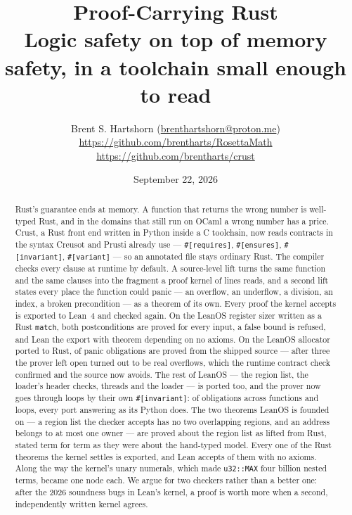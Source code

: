 \documentclass[11pt]{article}
\title{Proof-Carrying Rust\\
\large Logic safety on top of memory safety, in a toolchain small enough to read}
\author{Brent S. Hartshorn \orcidlink{0009-0004-2853-655X}
        \small (\url{brenthartshorn@proton.me})
\\
\small
\url{https://github.com/brentharts/RosettaMath}
\quad
\url{https://github.com/brentharts/crust}
}
\date{September 22, 2026}
\begin{document}
\maketitle

\begin{abstract}
Rust's guarantee ends at memory.  A function that returns the wrong number
is well-typed Rust, and in the domains that still run on OCaml a wrong
number has a price.  Crust, a Rust front end written in Python inside a C
toolchain, now reads contracts in the syntax Creusot and Prusti already use
--- \texttt{\#[requires]}, \texttt{\#[ensures]}, \texttt{\#[invariant]},
\texttt{\#[variant]} --- so an annotated file stays ordinary Rust.  The
compiler checks every clause at runtime by default.  A source-level lift
turns the same function and the same clauses into the fragment a proof
kernel of  lines reads, and a second lift states every place
the function could panic --- an overflow, an underflow, a division, an index,
a broken precondition --- as a theorem of its own.  Every proof the kernel
accepts is exported to Lean~4 and checked again.  On the LeanOS register
sizer written as a Rust \texttt{match}, both postconditions are proved for
every input, a false bound is refused, and Lean \regsLeanVerdict{} the export
with \regsLeanNoAxioms{} theorem depending on no axioms.  On the LeanOS
allocator ported to Rust, \allocProved{} of \allocObligations{} panic
obligations are proved from the shipped source --- after three the prover
left open turned out to be real overflows, which the runtime contract check
confirmed and the source now avoids.  The rest of LeanOS --- the region
list, the loader's header checks, threads and the loader --- is ported too,
and the prover now goes through loops by their own \texttt{\#[invariant]}:
\portProved{} of \portObligations{} obligations across \portFunctions{}
functions and \portLoops{} loops, every port answering as its Python does.
The two theorems LeanOS is founded on --- a region list the checker accepts
has no two overlapping regions, and an address belongs to at most one
owner --- are proved about the region list as lifted from Rust, stated term
for term as they were about the hand-typed model.
Every one of the \rustCertificates{} Rust theorems
the kernel settles is exported, and Lean accepts \rustLeanAgreed{} of them
with no axioms.  Along the way the kernel's unary numerals, which
made \texttt{u32::MAX} four billion nested terms, became one node each.  We
argue for two checkers rather than a better one: after the 2026 soundness
bugs in Lean's kernel, a proof is worth more when a second, independently
written kernel agrees.
\end{abstract}
\end{document}
